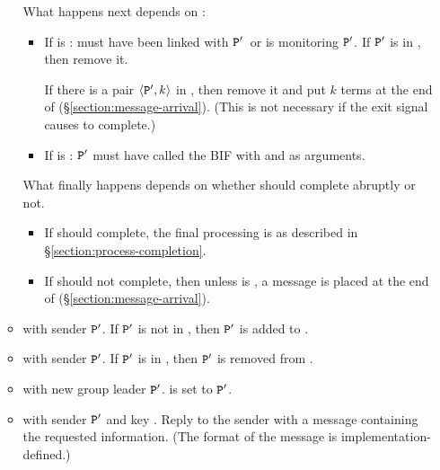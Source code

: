 \begin{itemize}
\begin{itemize}
What happens next depends on :
\begin{itemize}
\item If  is :  must have been linked
with ${\tt{\sl P}}'$\ifNew\ or is monitoring ${\tt{\sl P}}'$\fi.
If ${\tt{\sl P}}'$ is in , then
remove it.

\ifNew
{}
If there is a pair $\langle{\tt{\sl P}}',k\rangle$ in
, then remove it and put $k$ terms 
at the end of
 (\S\ref{section:message-arrival}). (This is not necessary if
the exit signal causes  to complete.)
\fi

\item If  is : ${\tt{\sl P}}'$ must have called the BIF
with  and  as arguments.
\end{itemize}

What finally happens depends on whether  should complete abruptly or not.
\begin{itemize}
\item If  should complete, the final processing is as described in
\S\ref{section:process-completion}.
\item If  should not complete, then
unless  is ,
a message  is placed at the end of
 (\S\ref{section:message-arrival}).
\end{itemize}

\item {}
 with sender ${\tt{\sl P}}'$.
If ${\tt{\sl P}}'$ is not in
, then ${\tt{\sl P}}'$ is added to .

\item {} with sender ${\tt{\sl P}}'$.
If ${\tt{\sl P}}'$ is in
, then ${\tt{\sl P}}'$ is removed from .

\item {}
 with new group leader ${\tt{\sl P}}'$.
 is set to ${\tt{\sl P}}'$.

\item {} with sender ${\tt{\sl P}}'$ and key .  Reply to the sender
with a message containing the requested information.
\ifNew (The format of the message is implementation-defined.) \fi

\end{itemize}
\end{itemize}

